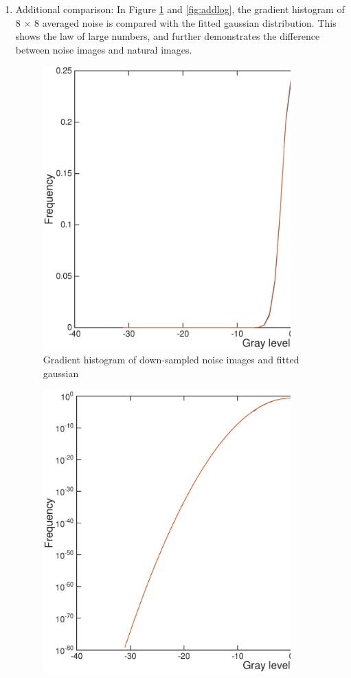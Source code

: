 \documentclass[11pt, oneside]{article}   	%
\begin{document}
\begin{enumerate}
\item Additional comparison: In Figure \ref{fig:add} and \ref{fig:addlog}, the gradient histogram of 8 $\times$ 8 averaged noise is compared with the fitted gaussian distribution. This shows the law of large numbers, and further demonstrates the difference between noise images and natural images.
\begin{figure}[H]
	\centering
	\includegraphics[width=0.9\textwidth]{add}
	\caption{Gradient histogram of down-sampled noise images and fitted gaussian}
	\label {fig:add}
\end{figure}
\begin{figure}[H]
	\centering
	\includegraphics[width=0.9\textwidth]{addlog}

\end{figure}
\end{enumerate}
\end{document}
